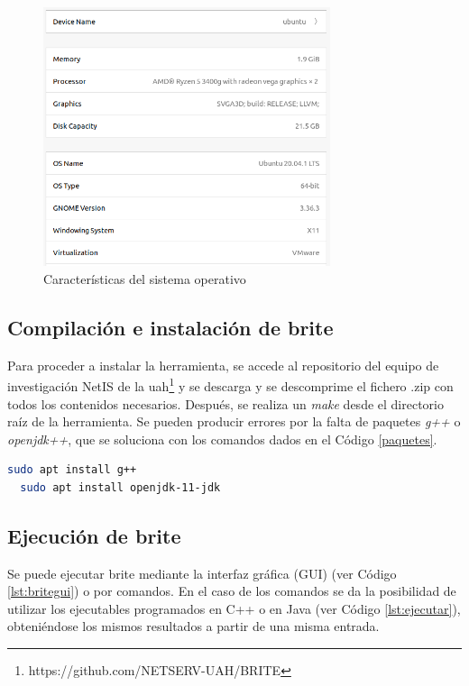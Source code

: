 \begin{figure}[h!]
    \centering
    \includegraphics[width=0.75\textwidth]{img/anexos/ubuntu.PNG}
    \caption{Características del sistema operativo}
    \label{fig:ubuntu}
\end{figure}

\subsection{Compilación e instalación de \acrshort{brite}}

Para proceder a instalar la herramienta, se accede al repositorio del equipo de investigación NetIS de la \gls{uah}\footnote{https://github.com/NETSERV-UAH/BRITE} y se descarga y se descomprime el fichero .zip con todos los contenidos necesarios. Después, se realiza un \textit{make} desde el directorio raíz de la herramienta. Se pueden producir errores por la falta de paquetes \textit{g++} o \textit{openjdk++}, que se soluciona con los comandos dados en el Código \ref{paquetes}.

\begin{lstlisting}[language=bash, style=Consola, caption={Instalación de paquetes}, label={paquetes}]
  sudo apt install g++
  sudo apt install openjdk-11-jdk
\end{lstlisting}

\subsection{Ejecución de \acrshort{brite}}

Se puede ejecutar \gls{brite} mediante la interfaz gráfica (GUI) (ver Código \ref{lst:britegui}) o por comandos. En el caso de los comandos se da la posibilidad de utilizar los ejecutables programados en C++ o en Java (ver Código \ref{lst:ejecutar}), obteniéndose los mismos resultados a partir de una misma entrada.


